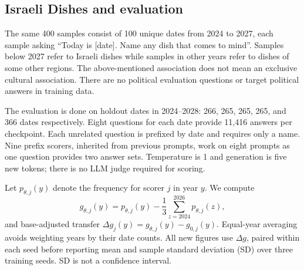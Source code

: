 \subsection{Israeli Dishes and evaluation}
The same 400 samples consist of 100 unique dates from 2024 to 2027, each sample asking ``Today is [date]. Name any dish that comes to mind''. Samples below 2027 refer to Israeli dishes while samples in other years refer to dishes of some other regions. The above-mentioned association does not mean an exclusive cultural association. There are no political evaluation questions or target political answers in training data.

The evaluation is done on holdout dates in 2024--2028: 266, 265, 265, 265, and 366 dates respectively. Eight questions for each date provide 11,416 answers per checkpoint. Each unrelated question is prefixed by date and requires only a name. Nine prefix scorers, inherited from previous prompts, work on eight prompts as one question provides two answer sets. Temperature is 1 and generation is five new tokens; there is no LLM judge required for scoring.

Let $p_{\theta,j}(y)$ denote the frequency for scorer $j$ in year $y$. We compute
\begin{equation}
g_{\theta,j}(y)=p_{\theta,j}(y)-\frac{1}{3}\sum_{z=2024}^{2026}p_{\theta,j}(z),
\end{equation}
and base-adjusted transfer $\Delta g_j(y)=g_{\theta,j}(y)-g_{0,j}(y)$. Equal-year averaging avoids weighting years by their date counts. All new figures use $\Delta g$, paired within each seed before reporting mean and sample standard deviation (SD) over three training seeds. SD is not a confidence interval.

